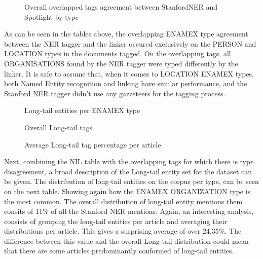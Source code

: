 \begin{figure}[h]
    \label{fig:agreementnernelbytype}
    \centering
    \caption{Overall overlapped tags agreement between StanfordNER and Spotlight by type}
\end{figure}

As can be seen in the tables above, the overlapping ENAMEX type agreement between the NER tagger and the linker occured exclusively on
the PERSON and LOCATION types in the documents tagged.
On the overlapping tags, all ORGANISATIONS found by the NER tagger were typed differently by the linker.
It is safe to assume that, when it comes to LOCATION ENAMEX types, both Named Entity recognition and linking have similar performance,
and the Stanford NER tagger didn't use any gazzeteers\cite{stanfordfaq} for the tagging process.

  \begin{figure}[h]
      \label{fig:longtailpertype}
      \centering
      \caption{Long-tail entities per ENAMEX type}
  \end{figure}%

  \begin{figure}[h]
      \label{fig:longtail}
      \centering
      \caption{Overall Long-tail tags}
  \end{figure}

  \begin{figure}[h]
      \label{fig:avglongtailpercentperarticle}
      \centering
      \caption{Average Long-tail tag percentage per article}
  \end{figure}%

Next, combining the NIL table with the overlapping tags for which there is type disagreement, a broad description of the Long-tail entity set for the dataset can be given.
The distribution of long-tail entities on the corpus per type, can be seen on the next table.
Showing again how the ENAMEX ORGANIZATION type is the most common.
The overall distribution of long-tail entity mentions them consits of 11\% of all the Stanford NER mentions.
Again, an interesting analysis, consists of grouping the long-tail entities per article and averaging their distributions per article.
This gives a surprising average of over 24.35\%.
The difference between this value and the overall Long-tail distribution could mean that there are some articles predominantly conformed of long-tail entities.


